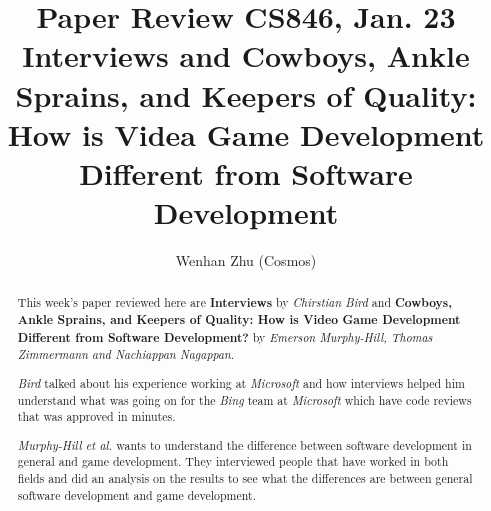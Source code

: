 \documentclass[sigconf]{acmart}
\begin{document}
%
\title{Paper Review CS846, Jan. 23\\
    Interviews and Cowboys, Ankle Sprains, and Keepers of Quality: How is Videa Game Development Different from Software Development
}

%
\author{Wenhan Zhu (Cosmos)}

%
\begin{abstract}
    This week's paper reviewed here are {\bf Interviews} by {\it Chirstian Bird} and {\bf Cowboys, Ankle Sprains, and Keepers of Quality: How is Video Game Development Different from Software Development?} by {\it Emerson Murphy-Hill, Thomas Zimmermann and Nachiappan Nagappan}.

    {\it Bird} talked about his experience working at {\it Microsoft} and how interviews helped him understand what was going on for the {\it Bing} team at {\it Microsoft} which have code reviews that was approved in minutes. 

    {\it Murphy-Hill et al.} wants to understand the difference between software development in general and game development. They interviewed people that have worked in both fields and did an analysis on the results to see what the differences are between general software development and game development.
\end{abstract}

%

%
\end{document}
